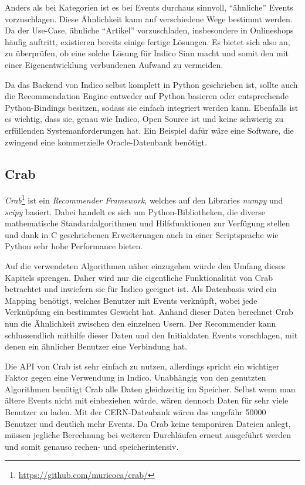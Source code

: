 Anders als bei Kategorien ist es bei Events durchaus sinnvoll, \enquote{ähnliche} Events
vorzuschlagen. Diese Ähnlichkeit kann auf verschiedene Wege bestimmt werden. Da der Use-Case,
ähnliche \enquote{Artikel} vorzuschladen, insbesondere in Onlineshops häufig auftritt, existieren
bereits einige fertige Lösungen. Es bietet sich also an, zu überprüfen, ob eine solche Lösung für
Indico Sinn macht und somit den mit einer Eigenentwicklung verbundenen Aufwand zu vermeiden.

Da das Backend von Indico selbst komplett in Python geschrieben ist, sollte auch die Recommendation
Engine entweder auf Python basieren oder entsprechende Python-Bindings besitzen, sodass sie einfach
integriert werden kann. Ebenfalls ist es wichtig, dass sie, genau wie Indico, Open Source ist und
keine schwierig zu erfüllenden Systemanforderungen hat. Ein Beispiel dafür wäre eine Software, die
zwingend eine kommerzielle Oracle-Datenbank benötigt.


\subsection{Crab}

\emph{Crab}\footnote{\href{https://github.com/muricoca/crab/}{https://github.com/muricoca/crab/}}
ist ein \emph{Recommender Framework}, welches auf den Libraries \emph{numpy} und \emph{scipy}
basiert. Dabei handelt es sich um Python-Bibliotheken, die diverse mathematische Standardalgorithmen
und Hilfsfunktionen zur Verfügung stellen und dank in C geschriebenen Erweiterungen auch in einer
Scriptsprache wie Python sehr hohe Performance bieten.

Auf die verwendeten Algorithmen näher einzugehen würde den Umfang dieses Kapitels sprengen. Daher
wird nur die eigentliche Funktionalität von Crab betrachtet und inwiefern sie für Indico geeignet
ist. Als Datenbasis wird ein Mapping benötigt, welches Benutzer mit Events verknüpft, wobei jede
Verknüpfung ein bestimmtes Gewicht hat. Anhand dieser Daten berechnet Crab nun die Ähnlichkeit
zwischen den einzelnen Usern. Der Recommender kann schlussendlich mithilfe dieser Daten und
den Initialdaten Events vorschlagen, mit denen ein ähnlicher Benutzer eine Verbindung hat.

Die API von Crab ist sehr einfach zu nutzen, allerdings spricht ein wichtiger Faktor gegen eine
Verwendung in Indico. Unabhängig von den genutzten Algorithmen benötigt Crab alle Daten gleichzeitig
im Speicher.  Selbst wenn man ältere Events nicht mit einbeziehen würde, wären dennoch Daten für
sehr viele Benutzer zu laden. Mit der CERN-Datenbank wären das ungefähr 50000 Benutzer und deutlich
mehr Events. Da Crab keine temporären Dateien anlegt, müssen jegliche Berechnung bei weiteren
Durchläufen erneut ausgeführt werden und somit genauso rechen- und speicherintensiv.


